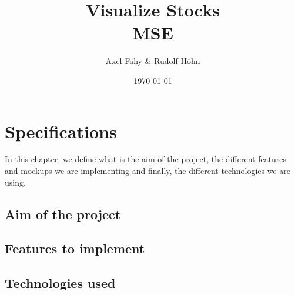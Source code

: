 \documentclass[11pt]{report}
\begin{document}
\title{Visualize Stocks\\MSE}
\date{\today}
\author{Axel Fahy \& Rudolf Höhn}
\maketitle

\tableofcontents

\pagestyle{fancy}     %

\chapter{Specifications}
In this chapter, we define what is the aim of the project, the different features and mockups we are implementing and finally, the different technologies we are using.
\section{Aim of the project}

\section{Features to implement}
\section{Technologies used}


\end{document}
